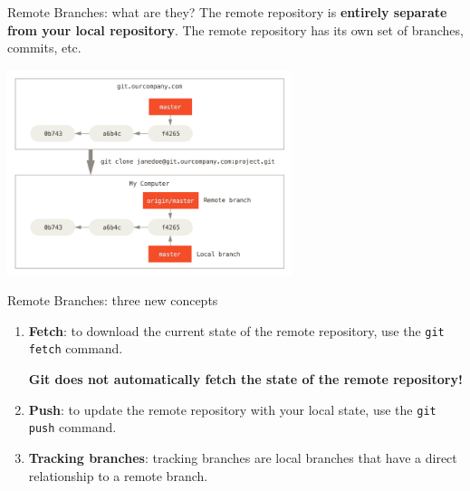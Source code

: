 \documentclass{beeper}
\begin{document}
\begin{frame}{Remote Branches: what are they?}
    The remote repository is \textbf{entirely separate from your local
    repository}. The remote repository has its own set of branches, commits,
    etc.

    \begin{center}
        \includegraphics[height=60mm]{graphics/remote-branches-1}
    \end{center}
\end{frame}

\begin{frame}{Remote Branches: three new concepts}
    \begin{enumerate}
        \item \textbf{Fetch}: to download the current state of the remote
            repository, use the \texttt{git fetch} command.

            \textbf{Git does not automatically fetch the state of the remote
            repository!}
            \pause

        \item \textbf{Push}: to update the remote repository with your local
            state, use the \texttt{git push} command.
            \pause

        \item \textbf{Tracking branches}: tracking branches are local branches
            that have a direct relationship to a remote branch.
    \end{enumerate}
\end{frame}
\end{document}

